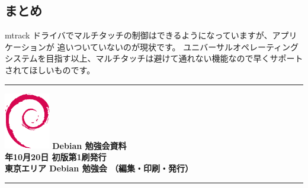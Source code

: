 \documentclass[mingoth,a4paper]{jsarticle}
\newcommand{\debmtgyear}{2012}
\newcommand{\debmtgmonth}{10}
\newcommand{\debmtgdate}{20}
\begin{document}
\subsection{まとめ}

mtrack ドライバでマルチタッチの制御はできるようになっていますが、アプリケーションが
追いついていないのが現状です。
ユニバーサルオペレーティングシステムを目指す以上、マルチタッチは避けて通れない機能なので早くサポートされてほしいものです。

\printindex

\cleartooddpage

\vspace*{15cm}
\hrule
\vspace{2mm}
\includegraphics[width=2cm]{image200502/openlogo-nd.eps}
\noindent \Large \bf Debian 勉強会資料\\
\noindent \normalfont \debmtgyear{}年\debmtgmonth{}月\debmtgdate{}日 \hspace{5mm}  初版第1刷発行\\
\noindent \normalfont 東京エリア Debian 勉強会 （編集・印刷・発行）\\
\hrule
\end{document}
